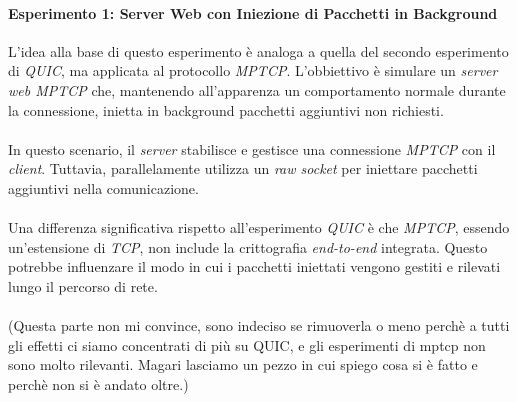 \paragraph{Esperimento 1: Server Web con Iniezione di Pacchetti in Background}
L'idea alla base di questo esperimento è analoga a quella del secondo esperimento di \emph{QUIC}, ma applicata al protocollo \emph{MPTCP}. 
L'obbiettivo è simulare un \emph{server web MPTCP} che, mantenendo all'apparenza un comportamento normale durante la connessione, inietta in background pacchetti aggiuntivi non richiesti.
\\\\
In questo scenario, il \emph{server} stabilisce e gestisce una connessione \emph{MPTCP} con il \emph{client}. Tuttavia, parallelamente utilizza un \emph{raw socket} per iniettare pacchetti aggiuntivi nella comunicazione.
\\\\
Una differenza significativa rispetto all'esperimento \emph{QUIC} è che \emph{MPTCP}, essendo un'estensione di \emph{TCP}, non include la crittografia \emph{end-to-end} integrata. 
Questo potrebbe influenzare il modo in cui i pacchetti iniettati vengono gestiti e rilevati lungo il percorso di rete.
\\\\
(Questa parte non mi convince, sono indeciso se rimuoverla o meno perchè a tutti gli effetti ci siamo concentrati di più su QUIC,
 e gli esperimenti di mptcp non sono molto rilevanti. Magari lasciamo un pezzo in cui spiego cosa si è fatto e perchè non si è andato oltre.)
